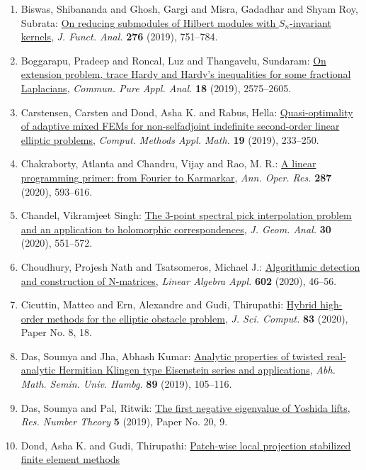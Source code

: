 \begin{enumerate}
\item Biswas, Shibananda and Ghosh, Gargi and Misra, Gadadhar and
Shyam Roy, Subrata: \href{https://doi.org/10.1016/j.jfa.2018.10.025}{On reducing submodules of {H}ilbert modules with
{${S}_n$}-invariant kernels}, \emph{J. Funct. Anal.} {\bf 276} (2019), 751--784.
\item Boggarapu, Pradeep and Roncal, Luz and Thangavelu, Sundaram: \href{https://doi.org/10.3934/cpaa.2019116}{On extension problem, trace {H}ardy and {H}ardy's inequalities
for some fractional {L}aplacians}, \emph{Commun. Pure Appl. Anal.} {\bf 18} (2019), 2575--2605.
\item Carstensen, Carsten and Dond, Asha K. and Rabus, Hella: \href{https://doi.org/10.1515/cmam-2019-0034}{Quasi-optimality of adaptive mixed {FEM}s for non-selfadjoint
indefinite second-order linear elliptic problems}, \emph{Comput. Methods Appl. Math.} {\bf 19} (2019), 233--250.
\item Chakraborty, Atlanta and Chandru, Vijay and Rao, M. R.: \href{https://doi.org/10.1007/s10479-019-03186-2}{A linear programming primer: from {F}ourier to {K}armarkar}, \emph{Ann. Oper. Res.} {\bf 287} (2020), 593--616.
\item Chandel, Vikramjeet Singh: \href{https://doi.org/10.1007/s12220-018-00123-w}{The 3-point spectral pick interpolation problem and an
application to holomorphic correspondences}, \emph{J. Geom. Anal.} {\bf 30} (2020), 551--572.
\item Choudhury, Projesh Nath and Tsatsomeros, Michael J.: \href{https://doi.org/10.1016/j.laa.2020.04.028}{Algorithmic detection and construction of {N}-matrices}, \emph{Linear Algebra Appl.} {\bf 602} (2020), 46--56.
\item Cicuttin, Matteo and Ern, Alexandre and Gudi, Thirupathi: \href{https://doi.org/10.1007/s10915-020-01195-z}{Hybrid high-order methods for the elliptic obstacle problem}, \emph{J. Sci. Comput.} {\bf 83} (2020), Paper No. 8, 18.
\item Das, Soumya and Jha, Abhash Kumar: \href{https://doi.org/10.1007/s12188-019-00206-7}{Analytic properties of twisted real-analytic {H}ermitian
{K}lingen type {E}isenstein series and applications}, \emph{Abh. Math. Semin. Univ. Hambg.} {\bf 89} (2019), 105--116.
\item Das, Soumya and Pal, Ritwik: \href{https://doi.org/10.1007/s40993-019-0158-x}{The first negative eigenvalue of {Y}oshida lifts}, \emph{Res. Number Theory} {\bf 5} (2019), Paper No. 20, 9.
\item Dond, Asha K. and Gudi, Thirupathi: \href{https://doi.org/10.1002/num.22317}{Patch-wise local projection stabilized finite element methods
}
\end{enumerate}
